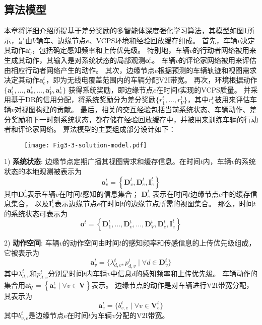 \subsection{算法模型}
本章将详细介绍所提基于差分奖励的多智能体深度强化学习算法，其模型如图\ref{fig 2-4}所示，是由$V$辆车、边缘节点$e$、VCPS环境和经验回放缓存组成。
首先，车辆$v$决定其动作$\boldsymbol{a}_{v}^{t}$，包括确定感知频率和上传优先级。
特别地，车辆$v$的行动者网络被用来生成其动作，其输入是对系统状态的局部观测$\boldsymbol{o}_{v}^{t}$。
车辆$v$的评论家网络被用来评估由相应行动者网络产生的动作。
其次，边缘节点$e$根据预测的车辆轨迹和视图需求决定其动作$\boldsymbol{a}_{e}^{t}$，即为无线电覆盖范围内的车辆分配V2I带宽。
再次，环境根据动作$\{ \boldsymbol{a}_{1}^{t}, \ldots, \boldsymbol{a}_{v}^{t}, \ldots, \boldsymbol{a}_{V}^{t}, \boldsymbol{a}_{e}^{t}\}$ 获得系统奖励，即边缘节点$e$在时间$t$实现的VCPS质量。
并采用基于DR的信用分配，将系统奖励分为差分奖励$\{r_1^t, \ldots, r_{V}^t\}$，其中$r_v^t$被用来评估车辆$v$对视图构建的贡献。
最后，相关的交互经验包括当前系统状态、车辆动作、差分奖励和下一时刻系统状态，都存储在经验回放缓存中，并被用来训练车辆的行动者和评论家网络。
算法模型的主要组成部分设计如下：

\begin{figure}[h]
\centering
  \texttt{[image: Fig3-3-solution-model.pdf]}
  \label{fig 2-4}
\end{figure}

1) \textbf{系统状态}: 边缘节点定期广播其视图需求和缓存信息。在时间$t$内，车辆$v$的系统状态的本地观测被表示为 
	\begin{equation}
		\boldsymbol{o}_{v}^{t}=\left\{\mathbf{D}_{v}^{t}, \mathbf{D}_{e}^{t}, \mathbf{I}_e^t\right\}
	\end{equation} 
	\noindent 其中$\mathbf{D}_{v}^{t}$表示车辆$v$在时间$t$感知的信息集合；
	$\mathbf{D}_{e}^{t}$ 表示在时间$t$边缘节点$e$中的缓存信息集合，
	以及$\mathbf{I}_e^t$表示边缘节点$e$在时间$t$的边缘节点所需的视图集合。
	那么，时间$t$的系统状态可表示为
	\begin{equation}
		\boldsymbol{o}^{t}=\left\{\mathbf{D}_{1}^{t}, \ldots, \mathbf{D}_{v}^{t}, \ldots, \mathbf{D}_{V}^{t}, \mathbf{D}_{e}^{t}, \mathbf{I}_{e}^{t}\right\}
	\end{equation}

2) \textbf{动作空间}: 车辆$v$的动作空间由时间$t$的感知频率和传感信息的上传优先级组成，它被表示为 
	\begin{equation}
		\boldsymbol{a}_{v}^{t}=\{ \lambda_{d, v}^{t}, p_{d, v}^{t} \mid \forall d \in \mathbf{D}_{v}^t\}
	\end{equation}
	\noindent 其中$\lambda_{d, v}^{t}$和$p_{d, v}^{t}$分别是时间$t$内车辆$v$中信息$d$的感知频率和上传优先级。
	车辆动作的集合用$\boldsymbol{a}_{\mathbf{V}}^{t} = \left\{\boldsymbol{a}_{v}^{t}\mid \forall v \in \mathbf{V}\right\}$表示。
	边缘节点的动作是对车辆进行V2I带宽分配，其表示为 
	\begin{equation}
		\boldsymbol{a}_{e}^{t}=\{b_{v, e}^{t} \mid \forall v \in \mathbf{V}_{e}^{t}\}
	\end{equation}
	其中$b_{v, e}^t$是边缘节点$e$在时间$t$为车辆$v$分配的V2I带宽。
	
